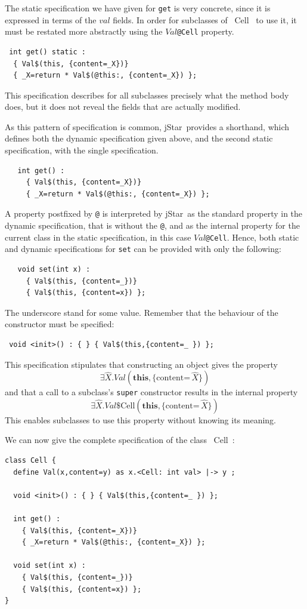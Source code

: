 \documentclass[11pt]{article}
\newcommand{\jStar}{{\sf jStar}}
\newcommand{\Val}{\mathit{Val}}
\newcommand{\ex}[1]{\mathord{\hat{#1}}}
\newcommand{\content}[1]{\{\text{content=} \, #1 \}}
\newcommand{\this}{\mathbf{this}}
\def\J{\lstinline}
\newcommand{\JS}[1]{$\mathit{#1}$}
\begin{document}
The static specification we have given for \J~get~ is very concrete, since it is expressed in terms of the 
$val$ fields.  In order for subclasses of \JS~Cell~ 
 to use it, it must be restated more abstractly using the \JS{Val}\J~@Cell~ property.
\begin{verbatim}
 int get() static : 
  { Val$(this, {content=_X})} 
  { _X=return * Val$(@this:, {content=_X}) };
 \end{verbatim}
This specification describes for all subclasses precisely what the method body
does, but it does not reveal the fields that are actually modified.

As this pattern of specification is common, \jStar \ provides a shorthand,
which defines both the dynamic specification given above, and the second
static specification, with the single specification.
%
\begin{verbatim}
   int get() : 
     { Val$(this, {content=_X})} 
     { _X=return * Val$(@this:, {content=_X}) };
\end{verbatim}
%
A property postfixed by \J~@~ is interpreted by \jStar \ as the
standard property in the dynamic specification, that is without the
\J~@~, and as the internal property for the current class in the
static specification, in this case \JS{Val}\J~@Cell~.
%
Hence, both static and dynamic specifications for \J~set~  can be provided with only the following: 
\begin{verbatim}
   void set(int x) : 
     { Val$(this, {content=_})} 
     { Val$(this, {content=x}) };
\end{verbatim}
 The underscore stand for some value.
Remember that the behaviour of the constructor must be specified:
%
\begin{verbatim}
 void <init>() : { } { Val$(this,{content=_ }) };
\end{verbatim}
This specification stipulates that constructing an object gives the property
$$\exists \ex X.\Val(\this,\content{\ex X})$$ and that a call to a subclass's \J~super~
constructor results in the internal property
$$\exists \ex X.\Val\mbox{\$Cell}(\this,\content{\ex X})$$  This enables subclasses
to use this property without knowing its meaning.

We can now give the complete specification of the class \JS~Cell~:
\begin{verbatim}
class Cell {
  define Val(x,content=y) as x.<Cell: int val> |-> y ;

  void <init>() : { } { Val$(this,{content=_ }) };
  
  int get() : 
    { Val$(this, {content=_X})} 
    { _X=return * Val$(@this:, {content=_X}) };

  void set(int x) : 
    { Val$(this, {content=_})} 
    { Val$(this, {content=x}) };
}
\end{verbatim}
\end{document}
